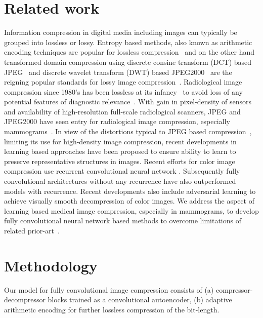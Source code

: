 \documentclass[10pt,twocolumn,letterpaper]{article}
\begin{document}
\section{Related work}

Information compression in digital media including images can typically be grouped into lossless or lossy. Entropy based methods, also known as arithmetic encoding techniques are popular for lossless compression~\cite{kuduvalli1992performance} and on the other hand transformed domain compression using discrete consine transform (DCT) based JPEG~\cite{wallace1992jpeg} and discrete wavelet transform (DWT) based JPEG2000~\cite{skodras2001jpeg} are the reigning popular standards for lossy image compression~\cite{saha2000image}. Radiological image compression since 1980's has been lossless at its infancy~\cite{wong1995radiologic} to avoid loss of any potential features of diagnostic relevance~\cite{kuduvalli1992performance}. With gain in pixel-density of sensors and availability of high-resolution full-scale radiological scanners, JPEG and JPEG2000 have seen entry for radiological image compression, especially mammograms~\cite{khademi2006comparison}. In view of the distortions typical to JPEG based compression~\cite{corchs2014no}, limiting its use for high-density image compression, recent developments in learning based approaches have been proposed to ensure ability to learn to preserve representative structures in images. Recent efforts for color image compression use recurrent convolutional neural network \cite{toderici2016full,johnston2017improved}. Subsequently fully convolutional architectures without any recurrence \cite{theis2017lossy} have also outperformed models with recurrence. Recent developments also include adversarial learning \cite{rippel2017real} to achieve visually smooth decompression of color images. We address the aspect of learning based medical image compression, especially in mammograms, to develop fully convolutional neural network based methods to overcome limitations of related prior-art~\cite{tan2011using}.

\section{Methodology}

Our model for fully convolutional image compression consists of (a) compressor-decompressor blocks trained as a convolutional autoencoder, (b) adaptive arithmetic encoding for further lossless compression of the bit-length.
\end{document}
